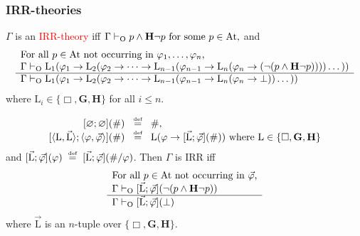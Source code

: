 \documentclass[xcolor=x11names]{beamer}
\newcommand{\dzsa}[1]{\textsc{\underline{#1}}:}
\newcommand{\bemph}[1] {{\color{DeepSkyBlue3}{#1}}}
\newcommand{\cemph}[1]{\textcolor{red}{#1}}
\newcommand{\FB}{\mathbf G}
\newcommand{\PB}{\mathbf H}
\newcommand{\lrule}[3][c]{\begin{array}{#1} #2  \\  \hline #3 \end{array}}
\newcommand{\defegy}[1][.1]{\hspace{#1cm}\overset{\textup{\tiny def}}{=}\hspace{#1cm}}
\newcommand{\lthen}{\rightarrow}
\newcommand{\liff}{\leftrightarrow}
\newcommand{\derives}[1][]{\vdash_{\mathrm{#1}}}
\newenvironment{tomb}[2][.1]{\arraycolsep=#1cm\begin{array}{#2}}{\end{array}}
\begin{document}
\begin{frame}[t]
	\frametitle{IRR-theories}
\scriptsize

\bemph{Intuitively,} $\Gamma$ is an \cemph{IRR-theory} iff
$\Gamma \derives[O] p \land \mathbf H \lnot p \textup{ for some $p\in \mathrm {At}$,}$
and
\[\lrule[l]
         {  \textup{For all $p\in \mathrm{At}$ not occurring in $\varphi_1, \dots , \varphi_n$,}
         \\ \Gamma \derives[O]\mathrm{L}_1 (\varphi_1 \lthen \mathrm{L}_2 (\varphi_2 \lthen \dots \lthen \mathrm{L}_{n-1}(\varphi_{n-1}\lthen \mathrm L_n(\varphi_n\lthen (\lnot (p \land \mathbf H\lnot p))) )\dots ))}
         {\Gamma \derives[O] \mathrm{L}_1 (\varphi_1 \lthen \mathrm{L}_2 (\varphi_2 \lthen \dots \lthen \mathrm{L}_{n-1}(\varphi_{n-1}\lthen \mathrm L_n(\varphi_n \lthen \bot))\dots ))}
\]
where $\mathrm{L}_i\in \{\Box, \FB, \PB\}$ for all $i\leq n$. 
\bigskip

\bemph{Precisely,}
\[\begin{tomb}{rcl}
   {}[\varnothing;\varnothing](\#)&\defegy& \#,
\\ {}[\langle\mathrm L,\vec{\mathrm L} \rangle;\langle \varphi, \vec\varphi \rangle](\#)&\defegy &\mathrm L ( \varphi \lthen [\vec{\mathrm L} ; \vec\varphi](\#))\textup{ where }\mathrm L \in \{\Box, \FB, \PB \}
\end{tomb}\]
and ${}[\vec{\mathrm L};\vec \varphi] (\varphi)\defegy {}[\vec{\mathrm L};\vec \varphi] ( {\#} / \varphi)$. Then $\Gamma$ is IRR iff
\[\lrule[l]
         {  \textup{For all $p\in \mathrm{At}$ not occurring in $\vec \varphi$,}
         \\ \Gamma \derives[O] [\vec{\mathrm L};\vec \varphi] (\lnot (p \land \mathbf H \lnot  p))}
         {  \Gamma \derives[O] [\vec{\mathrm L};\vec \varphi] (\bot)}\]
where $\vec{\mathrm L}$ is an $n$-tuple over $\{\Box, \FB, \PB\}$.


\end{frame}
\end{document}
